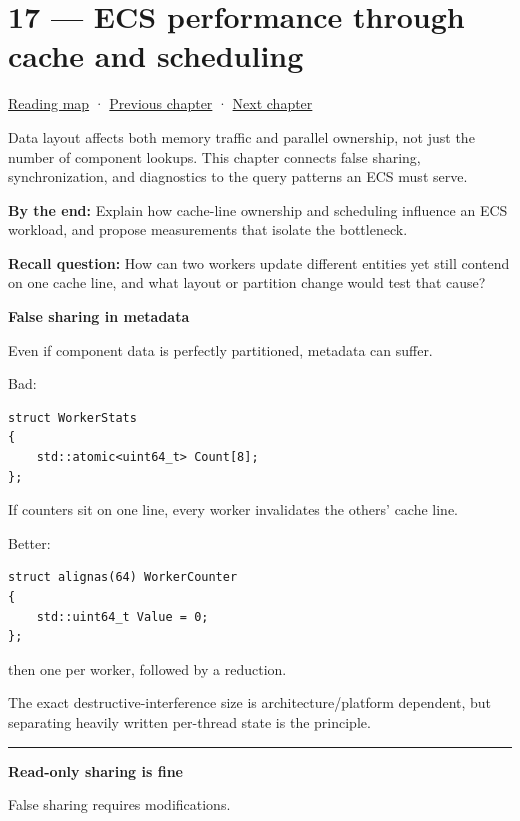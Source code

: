 \hypertarget{05-engine-i-ch017}{}
\chapter{17 --- ECS performance through cache and scheduling}\label{05-engine-i-ch017-ecs-performance-through-cache-and-scheduling}

\hyperref[volume-reading-map]{Reading map} · \hyperref[05-engine-i-ch016]{Previous chapter} · \hyperref[05-engine-i-ch018]{Next chapter}

Data layout affects both memory traffic and parallel ownership, not just the number of component lookups. This chapter connects false sharing, synchronization, and diagnostics to the query patterns an ECS must serve.

\textbf{By the end:} Explain how cache-line ownership and scheduling influence an ECS workload, and propose measurements that isolate the bottleneck.

\textbf{Recall question:} How can two workers update different entities yet still contend on one cache line, and what layout or partition change would test that cause?

\textbf{False sharing in metadata}

Even if component data is perfectly partitioned, metadata can suffer.

Bad:

\begin{verbatim}
struct WorkerStats
{
    std::atomic<uint64_t> Count[8];
};
\end{verbatim}

If counters sit on one line, every worker invalidates the others' cache line.

Better:

\begin{verbatim}
struct alignas(64) WorkerCounter
{
    std::uint64_t Value = 0;
};
\end{verbatim}

then one per worker, followed by a reduction.

The exact destructive-interference size is architecture/platform dependent, but separating heavily written per-thread state is the principle.

\begin{center}\rule{0.5\linewidth}{0.5pt}\end{center}

\textbf{Read-only sharing is fine}

False sharing requires modifications.

